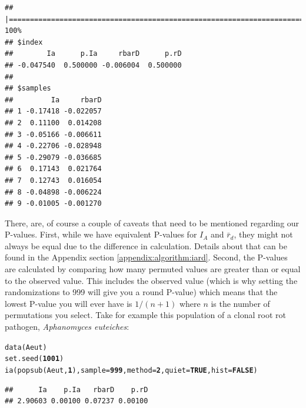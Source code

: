\documentclass[letterpaper]{article}\usepackage[]{graphicx}\usepackage[]{color}
\makeatletter
\newcommand{\hlnum}[1]{\textcolor[rgb]{0.502,0,0.502}{\textbf{#1}}}%
\newcommand{\hlstd}[1]{\textcolor[rgb]{0,0,0}{#1}}%
\newcommand{\hlkwc}[1]{\textcolor[rgb]{0,0.502,0.753}{#1}}%
\newcommand{\hlkwd}[1]{\textcolor[rgb]{0,0.267,0.4}{#1}}%
\newenvironment{kframe}{%
 \def\at@end@of@kframe{}%
 \ifinner\ifhmode%
  \def\at@end@of@kframe{\end{minipage}}%
  \begin{minipage}{\columnwidth}%
 \fi\fi%
 \def\FrameCommand##1{\hskip\@totalleftmargin \hskip-\fboxsep
 \colorbox{shadecolor}{##1}\hskip-\fboxsep
     \hskip-\linewidth \hskip-\@totalleftmargin \hskip\columnwidth}%
 \MakeFramed {\advance\hsize-\width
   \@totalleftmargin\z@ \linewidth\hsize
   \@setminipage}}%
 {\par\unskip\endMakeFramed%
 \at@end@of@kframe}
\newenvironment{knitrout}{}{} %
\makeatother
\begin{document}
\begin{knitrout}\footnotesize
{}\color{fgcolor}\begin{kframe}
\begin{verbatim}
## |================================================================================| 100%
## $index
##        Ia      p.Ia     rbarD      p.rD 
## -0.047540  0.500000 -0.006004  0.500000 
## 
## $samples
##         Ia     rbarD
## 1 -0.17418 -0.022057
## 2  0.11100  0.014208
## 3 -0.05166 -0.006611
## 4 -0.22706 -0.028948
## 5 -0.29079 -0.036685
## 6  0.17143  0.021764
## 7  0.12743  0.016054
## 8 -0.04898 -0.006224
## 9 -0.01005 -0.001270
\end{verbatim}
\end{kframe}
\end{knitrout}



There, are, of course a couple of caveats that need to be mentioned regarding our P-values. First, while we have equivalent P-values for $I_A$ and $\bar{r}_d$, they might not always be equal due to the difference in calculation. Details about that can be found in the Appendix section \ref{appendix:algorithm:iard}. Second, the P-values are calculated by comparing how many permuted values are greater than or equal to the observed value. This includes the observed value (which is why setting the randomizations to 999 will give you a round P-value) which means that the lowest P-value you will ever have is $1/(n+1)$ where $n$ is the number of permutations you select. Take for example this population of a clonal root rot pathogen, \textit{Aphanomyces euteiches}:
\begin{knitrout}\footnotesize
{}\color{fgcolor}\begin{kframe}
\begin{alltt}
\hlkwd{data}\hlstd{(Aeut)}
\hlkwd{set.seed}\hlstd{(}\hlnum{1001}\hlstd{)}
\hlkwd{ia}\hlstd{(}\hlkwd{popsub}\hlstd{(Aeut,} \hlnum{1}\hlstd{),} \hlkwc{sample} \hlstd{=} \hlnum{999}\hlstd{,} \hlkwc{method} \hlstd{=} \hlnum{2}\hlstd{,} \hlkwc{quiet} \hlstd{=} \hlnum{TRUE}\hlstd{,} \hlkwc{hist} \hlstd{=} \hlnum{FALSE}\hlstd{)}
\end{alltt}
\end{kframe}
\end{knitrout}

\begin{knitrout}\footnotesize
{}\color{fgcolor}\begin{kframe}
\begin{verbatim}
##      Ia    p.Ia   rbarD    p.rD 
## 2.90603 0.00100 0.07237 0.00100
\end{verbatim}
\end{kframe}
\end{knitrout}
\end{document}

